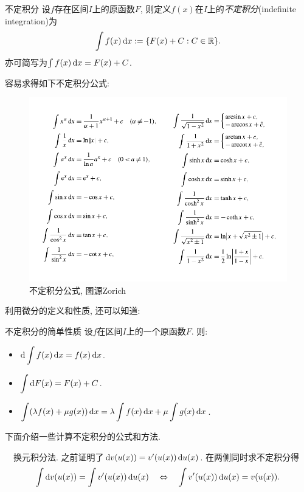 \begin{definition}{不定积分}
	设$f$存在区间$I$上的原函数$F$, 则定义$f(x)$在$I$上的\textit{不定积分}(indefinite integration)为$$\int f(x) \mathop{}\!\mathrm{d} x := \{ F(x)+C:C \in \mathbb{R} \}.$$
	亦可简写为$\int f(x) \mathop{}\!\mathrm{d} x = F(x)+C$. 
\end{definition}

容易求得如下不定积分公式: 

\begin{figure}[H]
	\centering
	\includegraphics[width=14cm]{attachment/不定积分表.pdf}
	\caption{不定积分公式, 图源Zorich}
\end{figure}

利用微分的定义和性质, 还可以知道: 

\begin{proposition}{不定积分的简单性质}
	设$f$在区间$I$上的一个原函数$F$. 则: 
	\begin{itemize}
		\item $\displaystyle \mathop{}\!\mathrm{d} \int f(x) \mathop{}\!\mathrm{d} x = f(x) \mathop{}\!\mathrm{d} x$. 
		\item $\displaystyle \int \mathop{}\!\mathrm{d} F(x) = F(x) + C$. 
		\item $\displaystyle \int (\lambda f(x)+ \mu g(x)) \mathop{}\!\mathrm{d} x = \lambda \int f(x) \mathop{}\!\mathrm{d} x + \mu \int g(x) \mathop{}\!\mathrm{d} x$. 
	\end{itemize}
\end{proposition}

下面介绍一些计算不定积分的公式和方法. 

~~换元积分法. 之前证明了$\mathop{}\!\mathrm{d} v(u(x)) = v'(u(x)) \mathop{}\!\mathrm{d} u(x)$. 在两侧同时求不定积分得$$\int \mathop{}\!\mathrm{d} v(u(x)) = \int v'(u(x)) \mathop{}\!\mathrm{d} u(x) \quad \Leftrightarrow \quad \int v'(u(x)) \mathop{}\!\mathrm{d} u(x) = v(u(x)). $$

